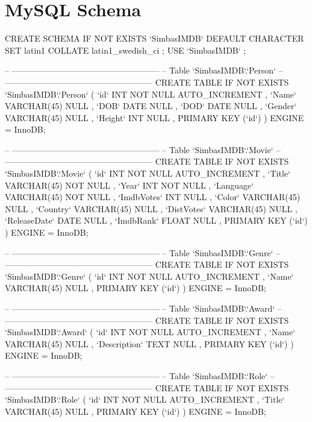 \section{MySQL Schema}
\begin{spverbatim}
CREATE SCHEMA IF NOT EXISTS `SimbasIMDB` DEFAULT CHARACTER SET latin1 COLLATE latin1_swedish_ci ;
USE `SimbasIMDB` ;

-- -----------------------------------------------------
-- Table `SimbasIMDB`.`Person`
-- -----------------------------------------------------
CREATE  TABLE IF NOT EXISTS `SimbasIMDB`.`Person` (
  `id` INT NOT NULL AUTO_INCREMENT ,
  `Name` VARCHAR(45) NULL ,
  `DOB` DATE NULL ,
  `DOD` DATE NULL ,
  `Gender` VARCHAR(45) NULL ,
  `Height` INT NULL ,
  PRIMARY KEY (`id`) )
ENGINE = InnoDB;


-- -----------------------------------------------------
-- Table `SimbasIMDB`.`Movie`
-- -----------------------------------------------------
CREATE  TABLE IF NOT EXISTS `SimbasIMDB`.`Movie` (
  `id` INT NOT NULL AUTO_INCREMENT ,
  `Title` VARCHAR(45) NOT NULL ,
  `Year` INT NOT NULL ,
  `Language` VARCHAR(45) NOT NULL ,
  `ImdbVotes` INT NULL ,
  `Color` VARCHAR(45) NULL ,
  `Country` VARCHAR(45) NULL ,
  `DistVotes` VARCHAR(45) NULL ,
  `ReleaseDate` DATE NULL ,
  `ImdbRank` FLOAT NULL ,
  PRIMARY KEY (`id`) )
ENGINE = InnoDB;


-- -----------------------------------------------------
-- Table `SimbasIMDB`.`Genre`
-- -----------------------------------------------------
CREATE  TABLE IF NOT EXISTS `SimbasIMDB`.`Genre` (
  `id` INT NOT NULL AUTO_INCREMENT ,
  `Name` VARCHAR(45) NULL ,
  PRIMARY KEY (`id`) )
ENGINE = InnoDB;


-- -----------------------------------------------------
-- Table `SimbasIMDB`.`Award`
-- -----------------------------------------------------
CREATE  TABLE IF NOT EXISTS `SimbasIMDB`.`Award` (
  `id` INT NOT NULL AUTO_INCREMENT ,
  `Name` VARCHAR(45) NULL ,
  `Description` TEXT NULL ,
  PRIMARY KEY (`id`) )
ENGINE = InnoDB;


-- -----------------------------------------------------
-- Table `SimbasIMDB`.`Role`
-- -----------------------------------------------------
CREATE  TABLE IF NOT EXISTS `SimbasIMDB`.`Role` (
  `id` INT NOT NULL AUTO_INCREMENT ,
  `Title` VARCHAR(45) NULL ,
  PRIMARY KEY (`id`) )
ENGINE = InnoDB;



\end{spverbatim}
